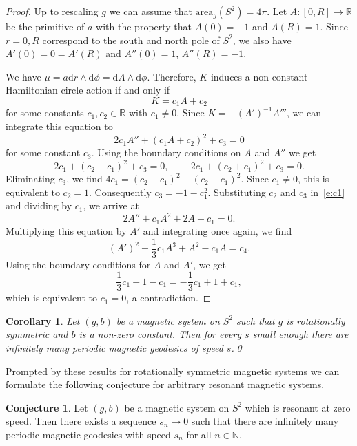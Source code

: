 \documentclass[10pt]{amsart}
\newtheorem{coro}[cdrthm]{Corollary}
\theoremstyle{definition}
\newtheorem*{conj*}{Conjecture}
\newcommand{\N}{\mathbb{N}}
\newcommand{\R}{\mathbb{R}}
\newcommand{\diff}{\mathrm{d}}
\newcommand{\area}{\mathrm{area}}
\begin{document}
\begin{proof}
Up to rescaling $g$ we can assume that $\area_g(S^2)=4\pi$. Let $A:[0,R]\to\R$ be the primitive of $a$ with the property that $A(0)=-1$ and $A(R)=1$. Since $r=0,R$ correspond to the south and north pole of $S^2$, we also have $A'(0)=0=A'(R)$ and $A''(0)=1$, $A''(R)=-1$.

We have $\mu=a\diff r\wedge\diff\phi=\diff A\wedge\diff\phi$. Therefore, $K$ induces a non-constant Hamiltonian circle action if and only if
\[
K=c_1A+c_2
\]
for some constants $c_1,c_2\in\R$ with $c_1\neq0$. Since $K=-(A')^{-1}A'''$, we can integrate this equation to
\begin{equation}\label{e:c1}
2c_1A''+\left(c_1A+c_2\right)^2+c_3=0
\end{equation}
for some constant $c_3$. Using the boundary conditions on $A$ and $A''$ we get
\[
2c_1+\left(c_2-c_1\right)^2+c_3=0,\quad -2c_1+\left(c_2+c_1\right)^2+c_3=0.
\]
Eliminating $c_3$, we find $4c_1=(c_2+c_1)^2-(c_2-c_1)^2$. Since $c_1\neq0$, this is equivalent to $c_2=1$. Consequently $c_3=-1-c_1^2$. Substituting $c_2$ and $c_3$ in~\eqref{e:c1} and dividing by $c_1$, we arrive at
\[
2A''+c_1A^2+2A-c_1=0.
\]
Multiplying this equation by $A'$ and integrating once again, we find
\[
(A')^2+\frac13c_1A^3+A^2-c_1A=c_4.
\]
Using the boundary conditions for $A$ and $A'$, we get
\[
\frac13c_1+1-c_1=-\frac13c_1+1+c_1,
\]
which is equivalent to $c_1=0$, a contradiction.
\end{proof}

\begin{coro}\label{c:rotinf}
Let $(g,b)$ be a magnetic system on $S^2$ such that $g$ is rotationally symmetric and $b$ is a non-zero constant. Then for every $s$ small enough there are infinitely many periodic magnetic geodesics of speed $s$.\qed
\end{coro}

Prompted by these results for rotationally symmetric magnetic systems we can formulate the following conjecture for arbitrary resonant magnetic systems.

\begin{conj*}
Let $(g,b)$ be a magnetic system on $S^2$ which is resonant at zero speed. Then there exists a sequence $s_n\to 0$ such that there are infinitely many periodic magnetic geodesics with speed $s_n$ for all $n\in\N$.
\end{conj*}
\end{document}
